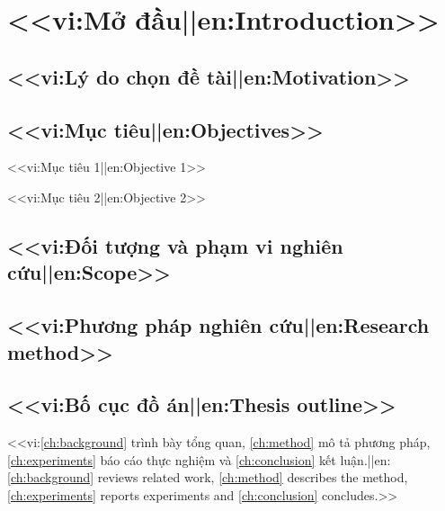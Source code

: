 \chapter{<<vi:Mở đầu||en:Introduction>>}
\label{ch:intro}

\section{<<vi:Lý do chọn đề tài||en:Motivation>>}

\section{<<vi:Mục tiêu||en:Objectives>>}
\begin{checklist}
  \item <<vi:Mục tiêu 1||en:Objective 1>>
  \item <<vi:Mục tiêu 2||en:Objective 2>>
\end{checklist}

\section{<<vi:Đối tượng và phạm vi nghiên cứu||en:Scope>>}

\section{<<vi:Phương pháp nghiên cứu||en:Research method>>}

\section{<<vi:Bố cục đồ án||en:Thesis outline>>}
<<vi:\cref{ch:background} trình bày tổng quan, \cref{ch:method} mô tả phương pháp, \cref{ch:experiments} báo cáo thực nghiệm và \cref{ch:conclusion} kết luận.||en:\cref{ch:background} reviews related work, \cref{ch:method} describes the method, \cref{ch:experiments} reports experiments and \cref{ch:conclusion} concludes.>>
